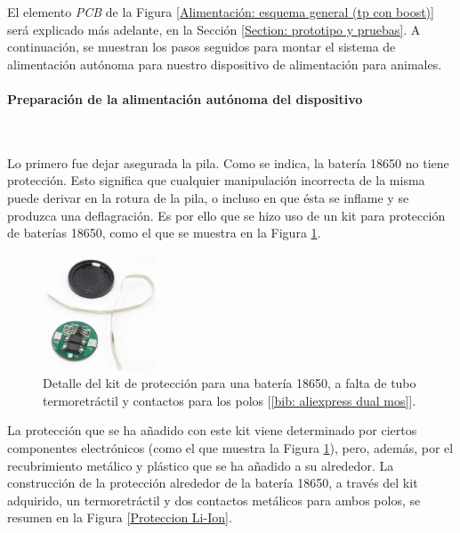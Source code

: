 \documentclass[12pt]{article}
\newcommand{\subsubsubsection}[1]{\paragraph{#1}\mbox{}\\}
\begin{document}
	\noindent El elemento \textit{PCB} de la Figura \ref{Alimentación: esquema general (tp con boost)} será explicado más adelante, en la Sección \ref{Section: prototipo y pruebas}. A continuación, se muestran los pasos seguidos para montar el sistema de alimentación autónoma para nuestro dispositivo de alimentación para animales. \\
	
	\subsubsubsection{Preparación de la alimentación autónoma del dispositivo}
	\label{Preparación de la alimentación autónoma del dispositivo}
	
	\noindent Lo primero fue dejar asegurada la pila. Como se indica, la batería 18650 no tiene protección. Esto significa que cualquier manipulación incorrecta de la misma puede derivar en la rotura de la pila, o incluso en que ésta se inflame y se produzca una deflagración. Es por ello que se hizo uso de un kit para protección de baterías 18650, como el que se muestra en la Figura \ref{Proteccion kit Li-Ion}.\\
	
	\pagebreak
	
	\begin{figure}[h!]
		\begin{center}
			\includegraphics[width=0.3\textwidth]{img/proteccion_18650.png}
			\caption{Detalle del kit de protección para una batería 18650, a falta de tubo termoretráctil y contactos para los polos [\ref{bib: aliexpress dual mos}].}
			\label{Proteccion kit Li-Ion}
		\end{center}
	\end{figure}
	
	\noindent La protección que se ha añadido con este kit viene determinado por ciertos componentes electrónicos (como el que muestra la Figura \ref{Proteccion kit Li-Ion}), pero, además, por el recubrimiento metálico y plástico que se ha añadido a su alrededor. La construcción de la protección alrededor de la batería 18650, a través del kit adquirido, un termoretráctil y dos contactos metálicos para ambos polos, se resumen en la Figura \ref{Proteccion Li-Ion}. \\
	
\end{document}
